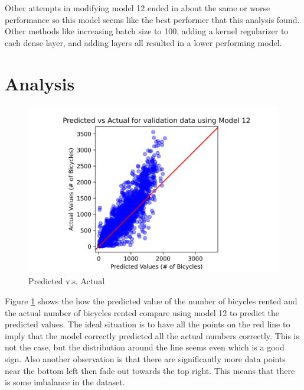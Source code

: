 \documentclass{article}
\begin{document}
    Other attempts in modifying model 12 ended in about the same or worse performance so this model seems like the best performer 
    that this analysis found. Other methods like increasing batch size to 100, adding a kernel regularizer to each dense layer, 
    and adding layers all resulted in a lower performing model.

\section{Analysis}
    \begin{figure}[h!]
        \includegraphics[width=\linewidth]{images/predictactual.png}
        \caption{Predicted v.s. Actual}
        \label{fig:predictactual}
    \end{figure}
    Figure \ref{fig:predictactual} shows the how the predicted value of the number of bicycles rented and the actual number of bicycles rented compare 
    using model 12 to predict the predicted values. 
    The ideal situation is to have all the points on the red line to imply that the model correctly predicted all the actual numbers correctly.
    This is not the case, but the distribution around the line seems even which is a good sign. Also another observation is that there are 
    significantly more data points near the bottom left then fade out towards the top right. This means that there is some imbalance in the dataset.
\end{document}
